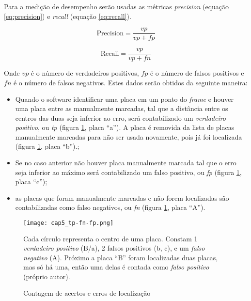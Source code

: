 Para a medição de desempenho serão usadas as métricas \emph{precision}
(equação \ref{eq:precision}) e \emph{recall} (equação \ref{eq:recall}).

\noindent\begin{minipage}{.5\linewidth}
	\begin{equation} \label{eq:precision}
		\text{Precision} = \frac{vp}{vp + fp}
	\end{equation}
\end{minipage}
\begin{minipage}{.5\linewidth}
	\begin{equation} \label{eq:recall}
		\text{Recall} = \frac{vp}{vp + fn}
	\end{equation}
\end{minipage}

Onde $vp$ é o número de verdadeiros positivos, $fp$ é o número de falsos
positivos e $fn$ é o número de falsos negativos. Estes dados serão obtidos da
seguinte maneira:

\begin{itemize}

\item Quando o software identificar uma placa em um ponto do \emph{frame} e
	houver uma placa entre as manualmente marcadas, tal que a distância entre
	os centros  das duas seja inferior ao erro, será contabilizado um
	\emph{verdadeiro positivo}, ou \emph{tp} (figura \ref{fig:cap5_tp-fn-fp},
	placa ``a'').
	A placa é removida da lista de placas manualmente marcadas para não
	ser usada novamente, pois já foi localizada (figura
	\ref{fig:cap5_tp-fn-fp}, placa ``b'').;

\item Se no caso anterior não houver placa manualmente marcada tal que o erro
	seja inferior ao máximo será contabilizado um falso positivo, ou \emph{fp}
	(figura \ref{fig:cap5_tp-fn-fp}, placa ``c'');

\item as placas que foram manualmente marcadas e não forem localizadas são
	contabilizadas como falso negativos, ou \emph{fn} (figura
	\ref{fig:cap5_tp-fn-fp}, placa ``A'').

\end{itemize}

\begin{figure}[!htb]
	\centering
	\texttt{[image: cap5\_tp-fn-fp.png]}
	\caption{Contagem de acertos e erros de localização}
	\label{fig:cap5_tp-fn-fp}
	Cada círculo representa o centro de uma placa. Constam 1 \emph{verdadeiro
	positivo} (B/a), 2 falsos positivos (b, c), e um \emph{falso negativo} (A).
	Próximo a placa ``B'' foram localizadas duas placas, mas
	só há uma, então uma delas é contada como \emph{falso positivo}
	(próprio autor).
\end{figure}


